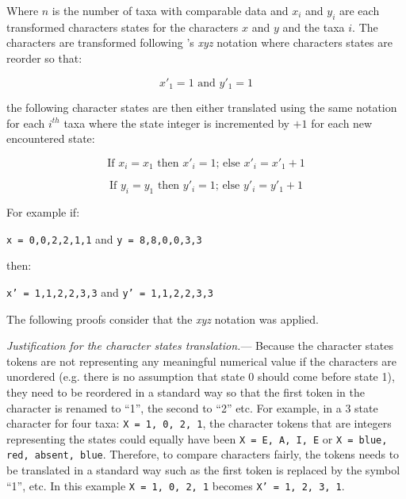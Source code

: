 \documentclass[12pt,letterpaper]{article}
\renewcommand{\subsection}[1]{%
\bigskip
\begin{center}
\begin{large}
\normalfont\itshape #1
\end{large}
\end{center}}
\renewcommand{\subsection}[1]{%
\vspace{2ex}
\noindent
\textit{#1.}---}
\begin{document}
\noindent Where $n$ is the number of taxa with comparable data and $x_i$ and $y_i$ are each transformed characters states for the characters $x$ and $y$ and the taxa $i$.
The characters are transformed following \cite{felsenstein2004inferring}'s \textit{xyz} notation where characters states are reorder so that:

\begin{equation}
x'_1 = 1 \text{ and } y'_1 = 1
\end{equation}

\noindent the following character states are then either translated using the same notation for each $i^{th}$ taxa where the state integer is incremented by $+1$ for each new encountered state:

\begin{equation}
\text{If } x_i = x_1 \text{ then } x'_i = 1 \text{; else } x'_i = x'_1 + 1
\end{equation}

\begin{equation}
\text{If } y_i = y_1 \text{ then } y'_i = 1 \text{; else } y'_i = y'_1 + 1
\end{equation}

\noindent For example if:

\texttt{x = {0,0,2,2,1,1}} and \texttt{y = {8,8,0,0,3,3}}

\noindent then:

\texttt{x' = {1,1,2,2,3,3}} and \texttt{y' = {1,1,2,2,3,3}}


\noindent The following proofs consider that the \textit{xyz} notation was applied.

\subsection{Justification for the character states translation}
Because the character states tokens are not representing any meaningful numerical value if the characters are unordered (e.g. there is no assumption that state 0 should come before state 1), they need to be reordered in a standard way so that the first token in the character is renamed to ``1'', the second to ``2'' etc.
For example, in a 3 state character for four taxa: \texttt{X = {1, 0, 2, 1}}, the character tokens that are integers representing the states could equally have been \texttt{X = {E, A, I, E}} or \texttt{X = {blue, red, absent, blue}}.
Therefore, to compare characters fairly, the tokens needs to be translated in a standard way such as the first token is replaced by the symbol ``1'', etc.
In this example \texttt{X = {1, 0, 2, 1}} becomes \texttt{X' = {1, 2, 3, 1}}.
\end{document}
